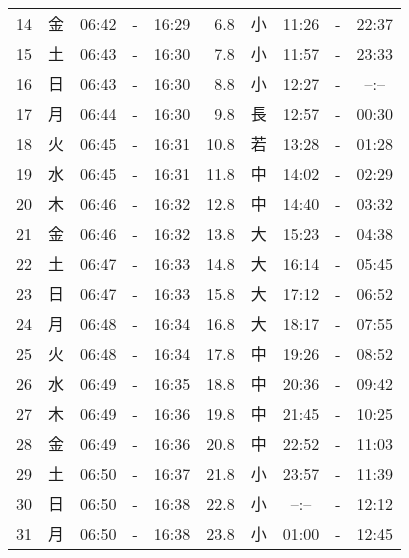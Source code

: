 \documentclass[a4j,10pt]{jsarticle}
\begin{document}
\begin{center}
\begin{table}[ht]
\begin{center}
\begin{tabular}{|rc|ccc|rc|ccc|}
 14 & 金 & 06:42 &-& 16:29 &  6.8 & 小 & 11:26 &-& 22:37 \\
 15 & 土 & 06:43 &-& 16:30 &  7.8 & 小 & 11:57 &-& 23:33 \\
 16 & 日 & 06:43 &-& 16:30 &  8.8 & 小 & 12:27 &-& --:-- \\
 17 & 月 & 06:44 &-& 16:30 &  9.8 & 長 & 12:57 &-& 00:30 \\
 18 & 火 & 06:45 &-& 16:31 & 10.8 & 若 & 13:28 &-& 01:28 \\
 19 & 水 & 06:45 &-& 16:31 & 11.8 & 中 & 14:02 &-& 02:29 \\
 20 & 木 & 06:46 &-& 16:32 & 12.8 & 中 & 14:40 &-& 03:32 \\
 21 & 金 & 06:46 &-& 16:32 & 13.8 & 大 & 15:23 &-& 04:38 \\
 22 & 土 & 06:47 &-& 16:33 & 14.8 & 大 & 16:14 &-& 05:45 \\
 23 & 日 & 06:47 &-& 16:33 & 15.8 & 大 & 17:12 &-& 06:52 \\
 24 & 月 & 06:48 &-& 16:34 & 16.8 & 大 & 18:17 &-& 07:55 \\
 25 & 火 & 06:48 &-& 16:34 & 17.8 & 中 & 19:26 &-& 08:52 \\
 26 & 水 & 06:49 &-& 16:35 & 18.8 & 中 & 20:36 &-& 09:42 \\
 27 & 木 & 06:49 &-& 16:36 & 19.8 & 中 & 21:45 &-& 10:25 \\
 28 & 金 & 06:49 &-& 16:36 & 20.8 & 中 & 22:52 &-& 11:03 \\
 29 & 土 & 06:50 &-& 16:37 & 21.8 & 小 & 23:57 &-& 11:39 \\
 30 & 日 & 06:50 &-& 16:38 & 22.8 & 小 & --:-- &-& 12:12 \\
 31 & 月 & 06:50 &-& 16:38 & 23.8 & 小 & 01:00 &-& 12:45 \\
\hline
\end{tabular}
\end{center}
\end{table}
\newpage
\end{center}
\end{document}
